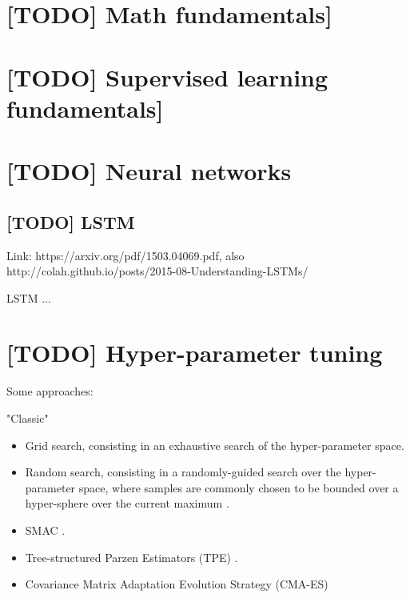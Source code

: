 \documentclass[12pt, english]{article}
\begin{document}
\tableofcontents

\newpage

\section{[TODO] Math fundamentals]}

\section{[TODO] Supervised learning fundamentals]}

\section{[TODO] Neural networks}

\subsection{[TODO] LSTM}

Link: https://arxiv.org/pdf/1503.04069.pdf, also http://colah.github.io/posts/2015-08-Understanding-LSTMs/

LSTM \cite{hochreiter_long_1997} \cite{greff_lstm_2017} ...

\section{[TODO] Hyper-parameter tuning}

Some approaches:

"Classic"

\begin{itemize}
  \item Grid search, consisting in an exhaustive search of the hyper-parameter space.
  \item Random search, consisting in a randomly-guided search over the hyper-parameter space, where samples are commonly chosen to be bounded over a hyper-sphere over the current maximum \cite{bergstra_random_2012}.
\end{itemize}

\begin{itemize}
  \item SMAC \cite{hutter_sequential_2011}.
  \item Tree-structured Parzen Estimators (TPE) \cite{bergstra_algorithms_2011}.
  \item Covariance Matrix Adaptation Evolution Strategy (CMA-ES) \cite{loshchilov_cma-es_2016}
\end{itemize}
\end{document}
